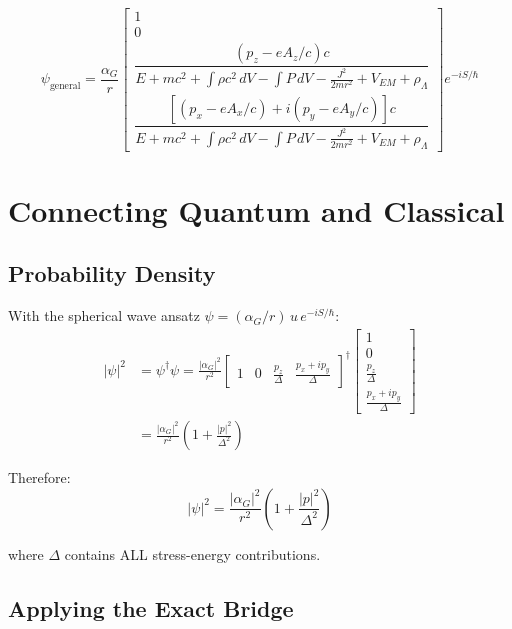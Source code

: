 \documentclass[11pt,a4paper]{article}
\theoremstyle{definition}
\theoremstyle{remark}
\begin{document}
	\begin{equation}
		\boxed{
			\psi_{\mathrm{general}} = \frac{\alpha_G}{r}\begin{bmatrix}
				1 \\ 0 \\
				\dfrac{(p_z-eA_z/c)c}{E+mc^2+\int\rho c^2\,dV-\int P\,dV-\frac{J^2}{2mr^2}+V_{EM}+\rho_\Lambda} \\[10pt]
				\dfrac{[(p_x-eA_x/c)+i(p_y-eA_y/c)]c}{E+mc^2+\int\rho c^2\,dV-\int P\,dV-\frac{J^2}{2mr^2}+V_{EM}+\rho_\Lambda}
			\end{bmatrix}e^{-iS/\hbar}
		}
	\end{equation}
	
	\section{Connecting Quantum and Classical}
	
	\subsection{Probability Density}
	
	With the spherical wave ansatz $\psi = (\alpha_G/r)\,u\,e^{-iS/\hbar}$:
	\begin{align}
		|\psi|^2 &= \psi^\dagger\psi
		= \frac{|\alpha_G|^2}{r^2}\begin{bmatrix}1&0&\frac{p_z}{\Delta}&\frac{p_x+ip_y}{\Delta}\end{bmatrix}^\dagger
		\begin{bmatrix}1\\0\\\frac{p_z}{\Delta}\\\frac{p_x+ip_y}{\Delta}\end{bmatrix} \\
		&= \frac{|\alpha_G|^2}{r^2}\!\left(1 + \frac{|p|^2}{\Delta^2}\right)
	\end{align}
	
	Therefore:
	\begin{equation}
		\boxed{|\psi|^2 = \frac{|\alpha_G|^2}{r^2}\!\left(1 + \frac{|p|^2}{\Delta^2}\right)}
		\label{eq:prob_density}
	\end{equation}
	
	where $\Delta$ contains ALL stress-energy contributions.
	
	\subsection{Applying the Exact Bridge}
	
\end{document}
